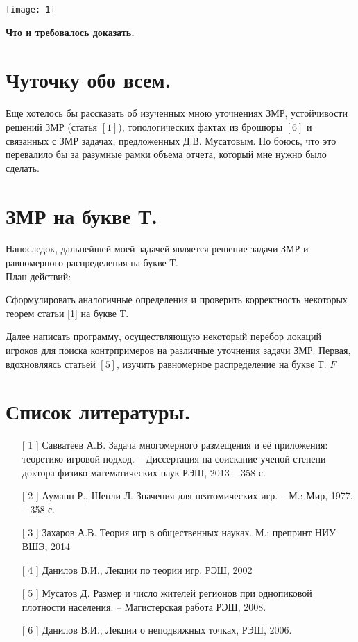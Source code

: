 \documentclass[a4paper,12pt]{article} %
\begin{document}
\begin{center}
	\texttt{[image: 1]}
\end{center} 

\textbf{Что и требовалось доказать.}

\section{Чуточку обо всем.}

Еще хотелось бы рассказать об изученных мною уточнениях ЗМР, устойчивости решений ЗМР (статья $[1]$), топологических фактах из брошюры $[6]$ и связанных с ЗМР задачах, предложенных Д.В. Мусатовым. Но боюсь, что это перевалило бы за разумные рамки объема отчета, который мне нужно было сделать.

\section{ЗМР на букве Т.}

Напоследок, дальнейшей моей задачей является решение задачи ЗМР и равномерного распределения на букве Т. \\ План действий: \par
Сформулировать аналогичные определения и проверить корректность некоторых теорем статьи [1] на букве Т. \par Далее написать программу, осуществляющую некоторый перебор локаций игроков для поиска контрпримеров на различные уточнения задачи ЗМР. Первая, вдохновляясь статьей $[5]$, изучить равномерное распределение на букве Т.
$\mathbin{F}$

\section{Список литературы.}

\begin{enumerate}[label=()]


\item [ [  1] ] Савватеев А.В. Задача многомерного размещения и её приложения: теоретико-игровой подход. – Диссертация на соискание ученой степени
доктора физико-математических наук РЭШ, 2013
– 358 с. 
\item [ [  2] ] Ауманн Р., Шепли Л. Значения для неатомических игр. – М.: Мир, 1977.
– 358 с.
\item [ [  3] ] Захаров А.В. Теория игр в общественных науках. М.: препринт НИУ ВШЭ, 2014
\item [ [  4] ] Данилов В.И., Лекции по теории игр. РЭШ, 2002

\item [ [  5] ] Мусатов Д. Размер и число жителей регионов при однопиковой
плотности населения. – Магистерская работа РЭШ, 2008.

\item [ [  6] ] Данилов В.И., Лекции о неподвижных точках, РЭШ, 2006.
\end{enumerate}
\end{document}

